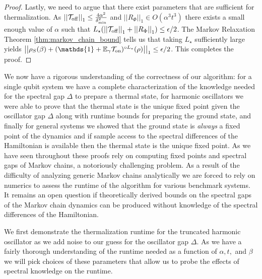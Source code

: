 \documentclass{article}
\newcommand{\on}{\rm on}
\newcommand{\off}{\rm off}
\newcommand{\norm}[1]{\left| \left| #1 \right| \right|}
\newcommand{\bigo}[1]{O\left(#1\right)}
\newcommand{\identity}{\mathds{1}}
\begin{document}
\begin{proof}
Lastly, we need to argue that there exist parameters that are sufficient for thermalization. As $\norm{\mathcal{T}_{\off}}_1 \le \frac{4 \alpha^2}{\delta_{\min}^2}$ and $\norm{R_{\Phi}}_1 \in \bigo{\alpha^3 t^3}$ there exists a small enough value of $\alpha$ such that $L_{\star}(\norm{\mathcal{T}_{\off}}_1 + \norm{R_{\Phi}}_1) \le \epsilon / 2$. The Markov Relaxation Theorem \ref{thm:markov_chain_bound} tells us that taking $L_{\star}$ sufficiently large yields $\norm{\rho_S(\beta) + (\identity + \mathbb{E}_{\gamma} \mathcal{T}_{\on})^{\circ L_{\star}}(\rho)}_1 \le \epsilon /2$. This completes the proof.
\end{proof}

We now have a rigorous understanding of the correctness of our algorithm: for a single qubit system we have a complete characterization of the knowledge needed for the spectral gap $\Delta$ to prepare a thermal state, for harmonic oscillators we were able to prove that the thermal state is the unique fixed point given the oscillator gap $\Delta$ along with runtime bounds for preparing the ground state, and finally for general systems we showed that the ground state is \emph{always} a fixed point of the dynamics and if sample access to the spectral differences of the Hamiltonian is available then the thermal state is the unique fixed point. As we have seen throughout these proofs rely on computing fixed points and spectral gaps of Markov chains, a notoriously challenging problem. As a result of the difficulty of analyzing generic Markov chains analytically we are forced to rely on numerics to assess the runtime of the algorithm for various benchmark systems. It remains an open question if theoretically derived bounds on the spectral gaps of the Markov chain dynamics can be produced without knowledge of the spectral differences of the Hamiltonian. 

We first demonstrate the thermalization runtime for the truncated harmonic oscillator as we add noise to our guess for the oscillator gap $\Delta$. As we have a fairly thorough understanding of the runtime needed as a function of $\alpha, t,$ and $\beta$ we will pick choices of these parameters that allow us to probe the effects of spectral knowledge on the runtime. 
\end{document}
